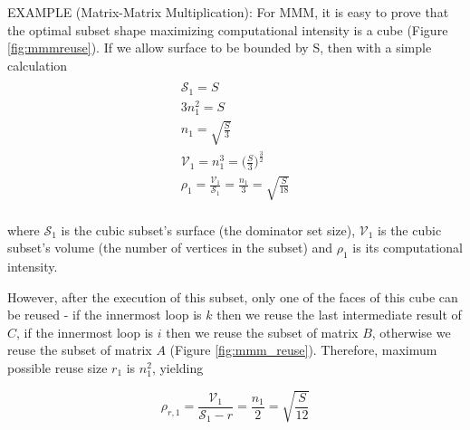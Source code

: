 \documentclass[sigconf]{acmart}
\begin{document}
EXAMPLE (Matrix-Matrix Multiplication): For MMM, it is easy to prove that 
the optimal subset shape maximizing computational intensity is a cube 
(Figure \ref{fig:mmmreuse}). If we allow surface to be bounded by S, 
then 
with a simple calculation	
\begin{multline}
\label{eq:cubic}
\\
\mathcal{S}_1 = S \\
3 n_1^2 = S \\
n_1 = \sqrt{\frac{S}{3}} \\
\mathcal{V}_1 = n_1^3 = \Big(\frac{S}{3}\Big)^{\frac{3}{2}} \\
\rho_1 = \frac{\mathcal{V}_1}{\mathcal{S}_1} = \frac{n_1}{3} = 
\sqrt{\frac{S}{18}}\\
\end{multline}

where $\mathcal{S}_1$ is the cubic subset's surface (the dominator set 
size), 
$\mathcal{V}_1$ is the cubic subset's volume (the number of vertices in 
the 
subset) and $\rho_1$ is its computational intensity.

However, after the execution of this subset, only one of the faces of 
this cube can be reused - if the innermost loop is $k$ then we reuse the 
last intermediate result of $C$, if the innermost loop is $i$ then we reuse 
the subset of matrix $B$, otherwise we reuse the subset of matrix $A$ 
(Figure \ref{fig:mmm_reuse}). Therefore, maximum possible reuse size $r_1$ 
is 
$n_1^2$, yielding 

$$\rho_{r,1} = \frac{\mathcal{V}_1}{\mathcal{S}_1 - r} = \frac{n_1}{2} = 
\sqrt{\frac{S}{12}}$$
\end{document}
